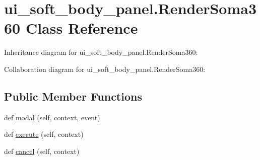 \hypertarget{classui__soft__body__panel_1_1RenderSoma360}{}\section{ui\+\_\+soft\+\_\+body\+\_\+panel.\+Render\+Soma360 Class Reference}
\label{classui__soft__body__panel_1_1RenderSoma360}


Inheritance diagram for ui\+\_\+soft\+\_\+body\+\_\+panel.\+Render\+Soma360\+:


Collaboration diagram for ui\+\_\+soft\+\_\+body\+\_\+panel.\+Render\+Soma360\+:
\subsection*{Public Member Functions}
\begin{DoxyCompactItemize}
\item 
def \hyperlink{classui__soft__body__panel_1_1RenderSoma360_ab0431fa3c02bcbb41743e7097fb84757}{modal} (self, context, event)
\item 
def \hyperlink{classui__soft__body__panel_1_1RenderSoma360_ad252d09442dc2be26ecd7db24eda6776}{execute} (self, context)
\item 
def \hyperlink{classui__soft__body__panel_1_1RenderSoma360_ae3052ed881b20778e651f176ede6e7a7}{cancel} (self, context)
\end{DoxyCompactItemize}
